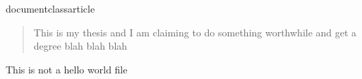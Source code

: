 documentclass{article}

\begin{abstract}
This is my thesis and I am claiming to do something worthwhile and get a degree blah blah blah
\end{abstract}

This is not a hello world \Latex file


